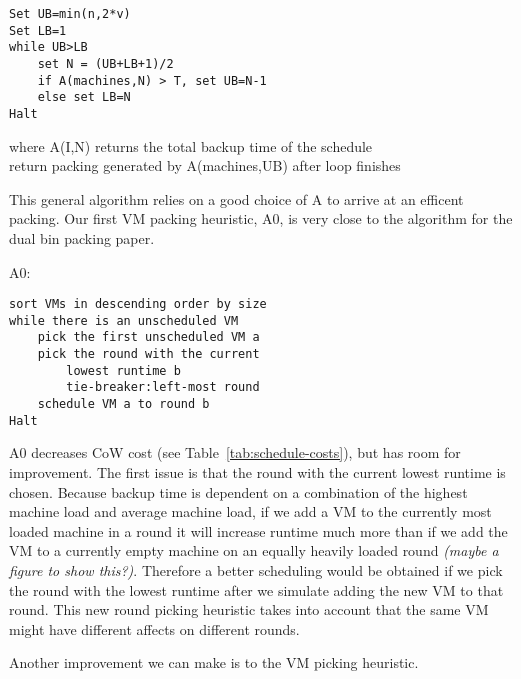 \begin{lstlisting}
Set UB=min(n,2*v)
Set LB=1
while UB>LB
    set N = (UB+LB+1)/2
    if A(machines,N) > T, set UB=N-1
    else set LB=N
Halt
\end{lstlisting}
where A(I,N) returns the total backup time of the schedule\\
return packing generated by A(machines,UB) after loop finishes

This general algorithm relies on a good choice of A to arrive at an efficent
packing. Our first VM packing heuristic, A0, is very close to the algorithm for
the dual bin packing paper.

A0:
\begin{lstlisting}
sort VMs in descending order by size
while there is an unscheduled VM
    pick the first unscheduled VM a
    pick the round with the current
        lowest runtime b
        tie-breaker:left-most round
    schedule VM a to round b
Halt
\end{lstlisting}

A0 decreases CoW cost (see Table~\ref{tab:schedule-costs}), but has room for
improvement. The first issue is that the round with the current lowest runtime
is chosen.  Because backup time is dependent on a combination of the highest
machine load and average machine load, if we add a VM to the currently most
loaded machine in a round it will increase runtime much more than if we add the
VM to a currently empty machine on an equally heavily loaded round
\textit{(maybe a figure to show this?)}. Therefore a better scheduling would be
obtained if we pick the round with the lowest runtime after we simulate adding
the new VM to that round. This new round picking heuristic takes into account
that the same VM might have different affects on different rounds.

Another improvement we can make is to the VM picking heuristic.
